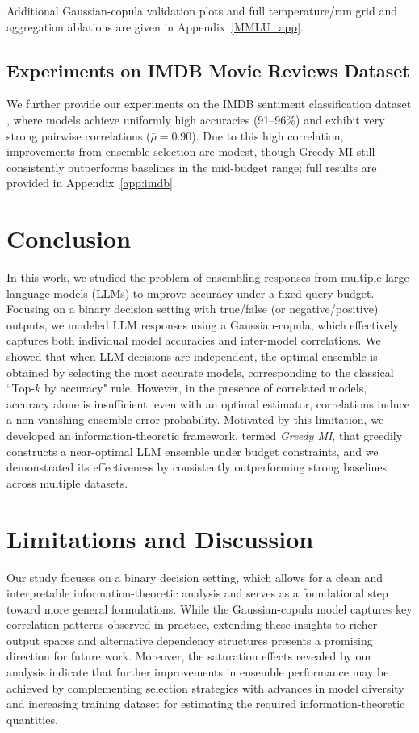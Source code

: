 \documentclass{article}
\theoremstyle{plain}
\theoremstyle{definition}
\theoremstyle{remark}
\begin{document}
Additional Gaussian-copula validation plots and full temperature/run grid and aggregation ablations are given in Appendix~\ref{MMLU_app}.

\subsection{Experiments on IMDB Movie Reviews Dataset}
We further provide our experiments on the IMDB sentiment classification dataset \cite{maas-etal-2011-learning}, where models achieve uniformly high accuracies (91--96\%) and exhibit very strong pairwise correlations ($\bar{\rho} = 0.90$). Due to this high correlation, improvements from ensemble selection are modest, though Greedy MI still consistently outperforms baselines in the mid-budget range; full results are provided in Appendix~\ref{app:imdb}.

\section{Conclusion}
In this work, we studied the problem of ensembling responses from multiple large language models (LLMs) to improve accuracy under a fixed query budget. Focusing on a binary decision setting with true/false (or negative/positive) outputs, we modeled LLM responses using a Gaussian-copula, which effectively captures both individual model accuracies and inter-model correlations. We showed that when LLM decisions are independent, the optimal ensemble is obtained by selecting the most accurate models, corresponding to the classical ``Top-$k$ by accuracy" rule. However, in the presence of correlated models, accuracy alone is insufficient: even with an optimal estimator, correlations induce a non-vanishing ensemble error probability. Motivated by this limitation, we developed an information-theoretic framework, termed \emph{Greedy MI}, that greedily constructs a near-optimal LLM ensemble under budget constraints, and we demonstrated its effectiveness by consistently outperforming strong baselines across multiple datasets.

\section{Limitations and Discussion}

Our study focuses on a binary decision setting, which allows for a clean and interpretable information-theoretic analysis and serves as a foundational step toward more general formulations. While the Gaussian-copula model captures key correlation patterns observed in practice, extending these insights to richer output spaces and alternative dependency structures presents a promising direction for future work. Moreover, the saturation effects revealed by our analysis indicate that further improvements in ensemble performance may be achieved by complementing selection strategies with advances in model diversity and increasing training dataset for  estimating the required information-theoretic quantities.
\end{document}
